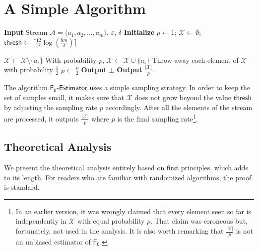 \documentclass[a4paper,UKenglish,cleveref, autoref, thm-restate]{lipics-v2021}
\newcommand{\stream}{\mathcal{A}}
\newcommand{\hybrid}{\ensuremath{\mathsf{F_0\mbox{-}Estimator}}}
\newcommand{\Fo}{\ensuremath{\mathsf{F_0}}}
\newcommand{\thresh}{\mathsf{thresh}}
\begin{document}
\section{A Simple Algorithm}


\begin{algorithm}
\caption{$\hybrid$}\label{algo:afinal}

\begin{algorithmic}[1]
\Statex \textbf{Input} Stream $\stream = \langle a_1,a_2,\ldots,a_m \rangle$, $\varepsilon$, $\delta$
 \State \textbf{Initialize}  $p \gets 1$; $\mathcal{X} \gets \emptyset$; $\thresh \gets \lceil\frac{12}{\varepsilon^2}\log (\frac{8m}{\delta})\rceil$
 \label{line:beginfor}





\State $\mathcal{X} \gets \mathcal{X} \setminus \{a_i\}$\label{line:afinal-drop}
\State With probability $p$, $\mathcal{X} \gets \mathcal{X} \cup \{a_i\}$ \label{line:afinal-pick}
\If{$|\mathcal{X}|= \thresh$}\label{line:Ifbegin}
\State Throw away each element of $\mathcal{X}$ with probability $\frac{1}{2}$ \label{line:final-throw}
\State $p \gets \frac{p}{2}$ \label{line:p}
\If{$|\mathcal{X}| = \thresh$}\label{line:check} \textbf{Output} $\bot$\label{line:fail}
\EndIf 
\EndIf \label{line:Ifend}
\EndFor \label{line:endfor}
\State \textbf{Output} $\frac{|\mathcal{X}|}{p}$\label{line:output}
\end{algorithmic}
\end{algorithm}

The algorithm $\hybrid$ uses a simple sampling strategy.
In order to keep the set of samples small, it makes sure that ${\mathcal{X}}$ does not grow beyond the value $\thresh$ by adjusting the sampling rate $p$ accordingly.
After all the elements of the stream are processed, it outputs
$\frac{|\mathcal{X}|}{p}$ where $p$ is the final sampling rate\footnote{In an earlier version, it was wrongly claimed that every element seen so far is independently in $\mathcal{X}$ with equal probability $p$. That claim was erroneous but, fortunately, not used in the analysis. It is also worth remarking that $\frac{|\mathcal{X}|}{p}$ is not an unbiased estimator of $\Fo$. }.

\subsection{Theoretical Analysis}
We present the theoretical analysis entirely based on first principles, which adds to its length. For readers who are familiar with randomized algorithms, the proof is standard. 
\end{document}
